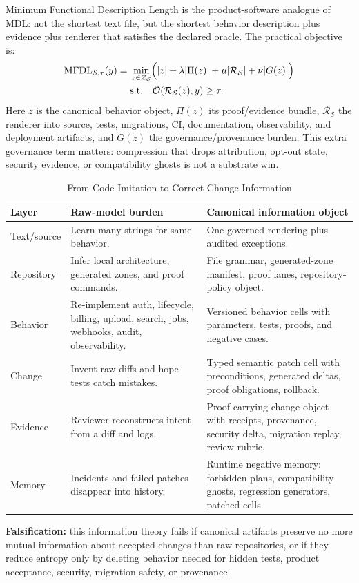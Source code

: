 Minimum Functional Description Length is the product-software analogue of MDL: not the shortest text file, but the shortest behavior description plus evidence plus renderer that satisfies the declared oracle. The practical objective is:
\begin{align}
\operatorname{MFDL}_{\mathcal{S},\tau}(y)
  ={}& \min_{z\in\mathcal{Z}_{\mathcal{S}}}
  \Bigl(|z|+\lambda|\Pi(z)|+\mu|\mathcal{R}_{\mathcal{S}}|
  +\nu|G(z)|\Bigr) \notag\\
& \text{s.t.}\quad
\mathcal{O}(\mathcal{R}_{\mathcal{S}}(z),y)\ge\tau.
\end{align}
Here $z$ is the canonical behavior object, $\Pi(z)$ its proof/evidence bundle, $\mathcal{R}_{\mathcal{S}}$ the renderer into source, tests, migrations, CI, documentation, observability, and deployment artifacts, and $G(z)$ the governance/provenance burden. This extra governance term matters: compression that drops attribution, opt-out state, security evidence, or compatibility ghosts is not a substrate win.

\begin{table}[t]
\caption{From Code Imitation to Correct-Change Information}
\label{tab:information-theory-spine}
\centering
\footnotesize
\begin{tabularx}{\textwidth}{p{}X X}
\toprule
Layer & Raw-model burden & Canonical information object \\
\midrule
Text/source & Learn many strings for same behavior. & One governed rendering plus audited exceptions. \\
Repository & Infer local architecture, generated zones, and proof commands. & File grammar, generated-zone manifest, proof lanes, repository-policy object. \\
Behavior & Re-implement auth, lifecycle, billing, upload, search, jobs, webhooks, audit, observability. & Versioned behavior cells with parameters, tests, proofs, and negative cases. \\
Change & Invent raw diffs and hope tests catch mistakes. & Typed semantic patch cell with preconditions, generated deltas, proof obligations, rollback. \\
Evidence & Reviewer reconstructs intent from a diff and logs. & Proof-carrying change object with receipts, provenance, security delta, migration replay, review rubric. \\
Memory & Incidents and failed patches disappear into history. & Runtime negative memory: forbidden plans, compatibility ghosts, regression generators, patched cells. \\
\bottomrule
\end{tabularx}
\end{table}

\textbf{Falsification:} this information theory fails if canonical artifacts preserve no more mutual information about accepted changes than raw repositories, or if they reduce entropy only by deleting behavior needed for hidden tests, product acceptance, security, migration safety, or provenance.


